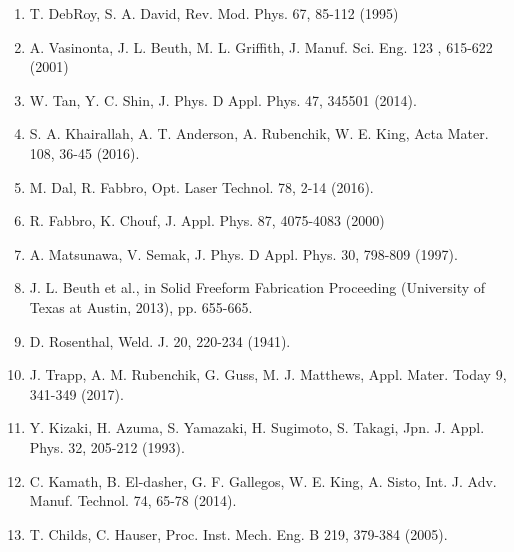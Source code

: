 \documentclass[10pt]{article}
\begin{document}
\begin{enumerate}
  \item T. DebRoy, S. A. David, Rev. Mod. Phys. 67, 85-112 (1995)

  \item A. Vasinonta, J. L. Beuth, M. L. Griffith, J. Manuf. Sci. Eng. 123 , 615-622 (2001)

  \item W. Tan, Y. C. Shin, J. Phys. D Appl. Phys. 47, 345501 (2014).

  \item S. A. Khairallah, A. T. Anderson, A. Rubenchik, W. E. King, Acta Mater. 108, 36-45 (2016).

  \item M. Dal, R. Fabbro, Opt. Laser Technol. 78, 2-14 (2016).

  \item R. Fabbro, K. Chouf, J. Appl. Phys. 87, 4075-4083 (2000)

  \item A. Matsunawa, V. Semak, J. Phys. D Appl. Phys. 30, 798-809 (1997).

  \item J. L. Beuth et al., in Solid Freeform Fabrication Proceeding (University of Texas at Austin, 2013), pp. 655-665.

  \item D. Rosenthal, Weld. J. 20, 220-234 (1941).

  \item J. Trapp, A. M. Rubenchik, G. Guss, M. J. Matthews, Appl. Mater. Today 9, 341-349 (2017).

  \item Y. Kizaki, H. Azuma, S. Yamazaki, H. Sugimoto, S. Takagi, Jpn. J. Appl. Phys. 32, 205-212 (1993).

  \item C. Kamath, B. El-dasher, G. F. Gallegos, W. E. King, A. Sisto, Int. J. Adv. Manuf. Technol. 74, 65-78 (2014).

  \item T. Childs, C. Hauser, Proc. Inst. Mech. Eng. B 219, 379-384 (2005).

\end{enumerate}
\end{document}
